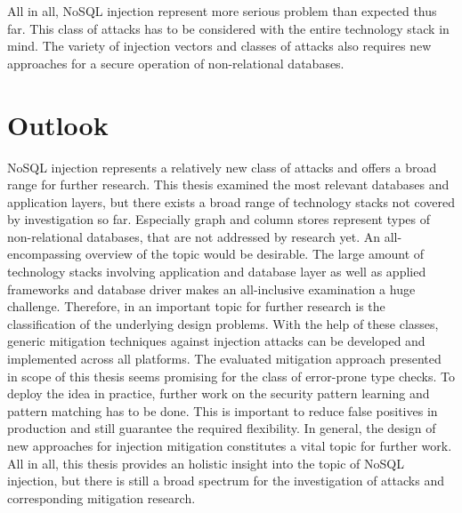 All in all, NoSQL injection represent more serious problem than expected thus far. This class of attacks has to be considered with the entire technology stack in mind. The variety of injection vectors and classes of attacks also requires new approaches for a secure operation of non-relational databases. 

\section{Outlook}
NoSQL injection represents a relatively new class of attacks and offers a broad range for further research. This thesis examined the most relevant databases and application layers, but there exists a broad range of technology stacks not covered by investigation so far. Especially graph and column stores represent types of non-relational databases, that are not addressed by research yet. An all-encompassing overview of the topic would be desirable. The large amount of technology stacks involving application and database layer as well as applied frameworks and database driver makes an all-inclusive examination a huge challenge. Therefore, in an important topic for further research is the classification of the underlying design problems. With the help of these classes, generic mitigation techniques against injection attacks can be developed and implemented across all platforms. The evaluated mitigation approach presented in scope of this thesis seems promising for the class of error-prone type checks. To deploy the idea in practice, further work on the security pattern learning and pattern matching has to be done. This is important to reduce false positives in production and still guarantee the required flexibility. In general, the design of new approaches for injection mitigation constitutes a vital topic for further work. All in all, this thesis provides an holistic insight into the topic of NoSQL injection, but there is still a broad spectrum for the investigation of attacks and corresponding mitigation research. 